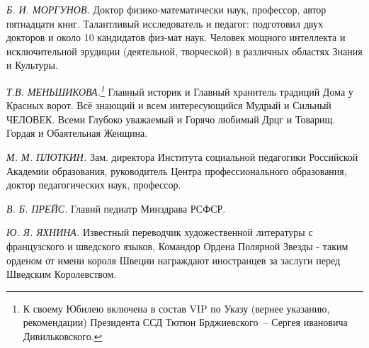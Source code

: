 \indent

\textit{Б. И. МОРГУНОВ.} Доктор физико-математически наук, профессор, автор пятнадцати книг. Талантливый исследователь и педагог: подготовил двух докторов и около 10 кандидатов физ-мат наук. Человек мощного интеллекта и исключительной эрудиции (деятельной, творческой) в различных областях Знания и Культуры.

\indent

\textit{Т.В. МЕНЬШИКОВА.\protect\footnote{К своему Юбилею включена в состав VIP по Указу (вернее указанию, рекомендации) Президента ССД Тютюн Брджиевского~-- Сергея ивановича Дивильковского.}} Главный историк и Главный хранитель традиций Дома у Красных ворот. Всё знающий и всем интересующийся Мудрый и Сильный ЧЕЛОВЕК. Всеми Глубоко уважаемый и Горячо любимый Дрцг и Товарищ. Гордая и Обаятельная Женщина.

\indent

\textit{М. М. ПЛОТКИН.} Зам. директора Института социальной педагогики Российской Академии образования, руководитель Центра профессионального образования, доктор педагогических наук, профессор.

\indent

\textit{В. Б. ПРЕЙС.} Главнй педиатр Минздрава РСФСР.

\indent

\textit{Ю. Я. ЯХНИНА.} Известный переводчик художественной литературы с французского и шведского языков,  Командор Ордена Полярной Звезды - таким орденом от имени короля Швеции награждают иностранцев за  заслуги перед Шведским Королевством.
